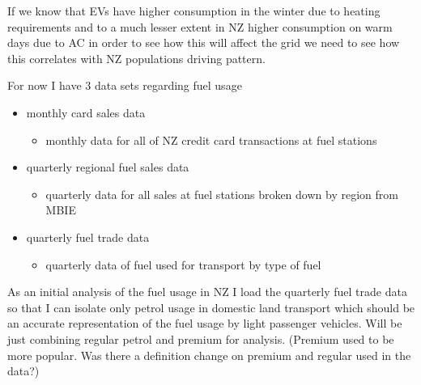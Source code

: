 \documentclass[
]{article}
\begin{document}
If we know that EVs have higher consumption in the winter due to heating
requirements and to a much lesser extent in NZ higher consumption on
warm days due to AC in order to see how this will affect the grid we
need to see how this correlates with NZ populations driving pattern.

For now I have 3 data sets regarding fuel usage

\begin{itemize}
  \item monthly card sales data 
  \begin{itemize}
    \item monthly data for all of NZ credit card transactions at fuel stations
  \end{itemize}
  \item quarterly regional fuel sales data
  \begin{itemize}
    \item quarterly data for all sales at fuel stations broken down by region from MBIE
  \end{itemize}
  \item quarterly fuel trade data
    \begin{itemize}
    \item quarterly data of fuel used for transport by type of fuel
  \end{itemize}
\end{itemize}

As an initial analysis of the fuel usage in NZ I load the quarterly fuel
trade data so that I can isolate only petrol usage in domestic land
transport which should be an accurate representation of the fuel usage
by light passenger vehicles. Will be just combining regular petrol and
premium for analysis. (Premium used to be more popular. Was there a
definition change on premium and regular used in the data?)
\end{document}
